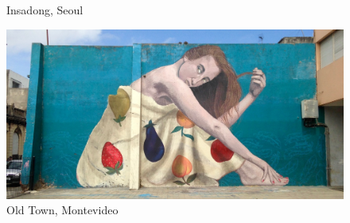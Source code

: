 \documentclass[
  letterpaper,
]{book}
\begin{document}
\begin{figure}
\begin{minipage}[t]{0.50\linewidth}
{

\caption{Insadong, Seoul}

}

\end{minipage}%

\end{figure}

\begin{figure}

{\centering \includegraphics{Montevideo.jpg}

}

\caption{Old Town, Montevideo}

\end{figure}
\end{document}
